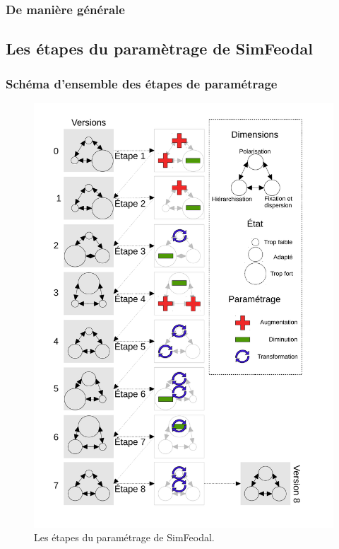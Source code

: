 \documentclass[12pt, a4paper, oneside]{book}
\begin{document}
	\subsubsection{De manière générale}
	
	\subsection{Les étapes du paramètrage de SimFeodal}
	
	\subsubsection{Schéma d'ensemble des étapes de paramétrage}
	
	\begin{figure}[H]
	\includegraphics[width = \linewidth]{img/schema_etapes_complexe.pdf}
	\caption{Les étapes du paramétrage de SimFeodal.}
	\label{fig:etapes-parametrage-simfeodal}
\end{figure}
	
\end{document}
